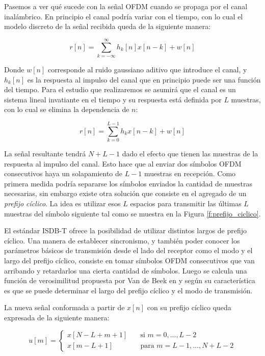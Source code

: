 Pasemos a ver qué sucede con la señal OFDM cuando se propaga por el canal inalámbrico. En principio el canal podría variar con el tiempo, con lo cual el modelo discreto de la señal recibida queda de la siguiente manera:

\begin{equation}
r[n] = \sum_{k = -\infty}^{\infty} h_k[n]x[n-k] + w[n]
\end{equation}

Donde $w[n]$ corresponde al ruido gaussiano aditivo que introduce el canal, y $h_k[n]$ es la respuesta al impulso del canal que en principio puede ser una función del tiempo. Para el estudio que realizaremos se asumirá que el canal es un sistema lineal invatiante en el tiempo y su respuesta está definida por $L$ muestras, con lo cual se elimina la dependencia de $n$:

\begin{equation}
r[n] = \sum_{k = 0}^{L-1} h_k x[n-k] + w[n]
\end{equation}

La señal resultante tendrá $N+L-1$ dado el efecto que tienen las muestras de la respuesta al impulso del canal. Esto hace que al enviar dos símbolos OFDM consecutivos haya un solapamiento de $L-1$ muestras en recepción. Como primera medida podría separarse los símbolos enviados la cantidad de muestras necesarias, sin embargo existe otra solución que consiste en el agregado de un \textit{prefijo cíclico}. La idea es utilizar esos $L$ espacios para transmitir las últimas $L$ muestras del símbolo siguiente tal como se muestra en la Figura \ref{f:prefijo_ciclico}.



El estándar ISDB-T ofrece la posibilidad de utilizar distintos largos de prefijo cíclico. Una manera de establecer sincronismo, y también poder conocer los parámetros básicos de transmisión desde el lado del receptor como el modo y el largo del prefijo cíclico, consiste en tomar símbolos OFDM consecutivos que van arribando y retardarlos una cierta cantidad de símbolos. Luego se calcula una función de verosimilitud propuesta por Van de Beek en \cite{van1997ml} y según su característica es que se puede determinar el largo del prefijo cíclico y el modo de transmisión.  

La nueva señal conformada a partir de $x[n]$ con su prefijo cíclico queda expresada de la siguiente manera:

\begin{equation}
 u[m] =
  \begin{cases}
    x[N-L+m+1]       & \quad \text{si } m = 0,..., L-2\\
    x[m-L+1]  & \quad \text{para } m = L-1,..., N+L-2
  \end{cases}
\end{equation}

